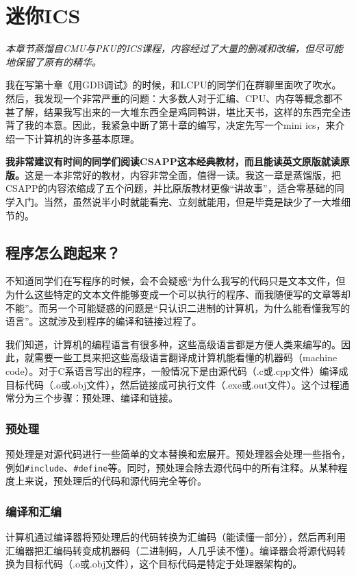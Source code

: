 \documentclass[../main.tex]{subfiles}
\begin{document}
\chapter{迷你ICS}

\begin{flushright}
  \emph{本章节蒸馏自CMU与PKU的ICS课程，内容经过了大量的删减和改编，但尽可能地保留了原有的精华。}
\end{flushright}

我在写第十章《用GDB调试》的时候，和LCPU的同学们在群聊里面吹了吹水。然后，我发现一个非常严重的问题：大多数人对于汇编、CPU、内存等概念都不甚了解，结果我写出来的一大堆东西全是鸡同鸭讲，堪比天书，这样的东西完全违背了我的本意。因此，我紧急中断了第十章的编写，决定先写一个mini ics，来介绍一下计算机的许多基本原理。

\textbf{我非常建议有时间的同学们阅读CSAPP这本经典教材，而且能读英文原版就读原版。}这是一本非常好的教材，内容非常全面，值得一读。我这一章是蒸馏版，把CSAPP的内容浓缩成了五个问题，并比原版教材更像“讲故事”，适合零基础的同学入门。当然，虽然说半小时就能看完、立刻就能用，但是毕竟是缺少了一大堆细节的。

\section{程序怎么跑起来？}

不知道同学们在写程序的时候，会不会疑惑“为什么我写的代码只是文本文件，但为什么这些特定的文本文件能够变成一个可以执行的程序、而我随便写的文章等却不能”。而另一个可能疑惑的问题是“只认识二进制的计算机，为什么能看懂我写的语言”。这就涉及到程序的编译和链接过程了。

我们知道，计算机的编程语言有很多种，这些高级语言都是方便人类来编写的。因此，就需要一些工具来把这些高级语言翻译成计算机能看懂的机器码（machine code）。对于C系语言写出的程序，一般情况下是由源代码（.c或.cpp文件）编译成目标代码（.o或.obj文件），然后链接成可执行文件（.exe或.out文件）。这个过程通常分为三个步骤：预处理、编译和链接。

\subsection{预处理}
预处理是对源代码进行一些简单的文本替换和宏展开。预处理器会处理一些指令，例如\texttt{\#include}、\texttt{\#define}等。同时，预处理会除去源代码中的所有注释。从某种程度上来说，预处理后的代码和源代码完全等价。

\subsection{编译和汇编}
计算机通过编译器将预处理后的代码转换为汇编码（能读懂一部分），然后再利用汇编器把汇编码转变成机器码（二进制码，人几乎读不懂）。编译器会将源代码转换为目标代码（.o或.obj文件），这个目标代码是特定于处理器架构的。
\end{document}
